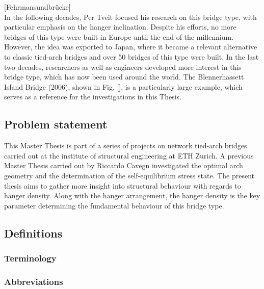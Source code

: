 [Fehrmansundbrücke]\\

In the following decades, Per Tveit focused his research on this bridge type, with particular emphasis on the hanger inclination. Despite his efforts, no more bridges of this type were built in Europe until the end of the millennium. However, the idea was exported to Japan, where it became a relevant alternative to classic tied-arch bridges and over 50 bridges of this type were built. In the last two decades, researchers as well as engineers developed more interest in this bridge type, which has now been used around the world. The Blennerhassett Island Bridge (2006), shown in Fig. [], is a particularly large example, which serves as a reference for the investigations in this Thesis.

\subsection{Problem statement} \label{sec:int_prob}
This Master Thesis is part of a series of projects on network tied-arch bridges carried out at the institute of structural engineering at ETH Zurich. A previous Master Thesis carried out by Riccardo Cavegn investigated the optimal arch geometry and the determination of the self-equilibrium stress state. The present thesis aims to gather more insight into structural behaviour with regards to hanger density.
Along with the hanger arrangement, the hanger density is the key parameter determining the fundamental behaviour of this bridge type.\\

\subsection{Definitions} \label{sec:int_def}
\subsubsection{Terminology} 
\subsubsection{Abbreviations}